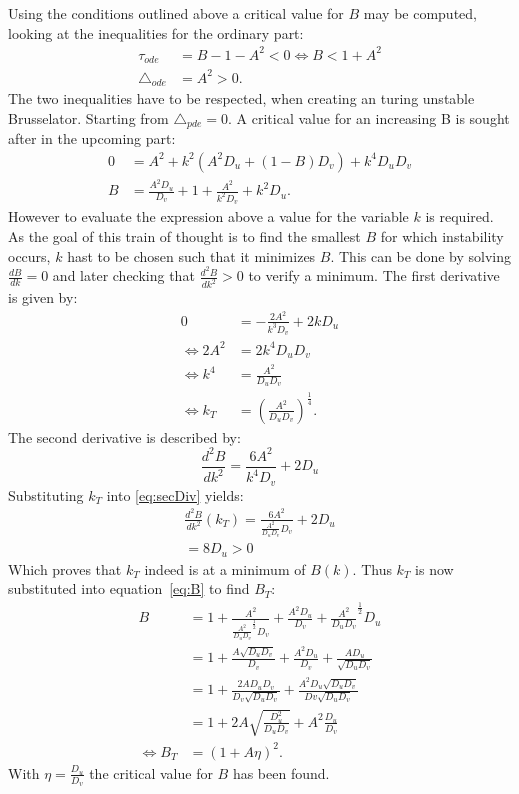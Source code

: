 Using the conditions outlined above a critical value for $B$ may be computed, looking at the inequalities for the ordinary part:
\begin{align}
\tau_{ode} &= B - 1 - A^2 < 0 \Leftrightarrow B < 1 + A^2 \\
\triangle_{ode} &= A^2 > 0.
\end{align}
The two inequalities have to be respected, when creating an turing unstable Brusselator. Starting from $\triangle_{pde} = 0$. A critical value for an increasing B is sought after in the upcoming part:
\begin{align}
0 &= A^2 + k^2 (A^2 D_u + (1 - B)D_v) + k^4D_u D_v \\
B &= \frac{A^2 D_u}{D_v} + 1 + \frac{A^2}{k^2 D_v} + k^2 D_u. 
\label{eq:B}
\end{align}
However to evaluate the expression above a value for the variable $k$ is required. As the goal of this train of thought is to find the smallest $B$ for which instability occurs, $k$ hast to be chosen such that it minimizes $B$. This can be done by solving $\frac{dB}{dk} = 0$ and later checking that $\frac{d^2 B}{dk^2} > 0$ to verify a minimum. The first derivative is given by:
\begin{align}
0 &= -\frac{2 A^2}{k^3 D_v} + 2kD_u \\
\Leftrightarrow 2A^2 &= 2k^4 D_u D_v \\
\Leftrightarrow k^4 &= \frac{A^2}{D_u D_v} \\
\Leftrightarrow k_T &= (\frac{A^2}{D_u D_v})^\frac{1}{4}.
\end{align}
The second derivative is described by:
\begin{equation}
\frac{d^2B}{dk^2} =\frac{6 A^2}{k^4 D_v} + 2 D_u
\label{eq:secDiv}
\end{equation}
Substituting $k_T$ into \ref{eq:secDiv} yields:
\begin{align}
\frac{d^2B}{dk^2}(k_T) = \frac{6A^2}{\frac{A^2}{D_u D_v} D_v} + 2D_u \\
= 8 D_u > 0 
\end{align}
Which proves that $k_T$ indeed is at a minimum of $B(k)$. Thus $k_T$ is now substituted into equation~\ref{eq:B} to find $B_T$:
\begin{align}
B &= 1 + \frac{A^2}{\frac{A^2}{D_u D_v}^\frac{1}{2} D_v} + \frac{A^2D_u}{D_v} + \frac{A^2}{D_u D_v}^\frac{1}{2} D_u \\
 &= 1 + \frac{A \sqrt{D_u D_v}}{D_v} + \frac{A^2 D_u}{D_v} + \frac{A D_u}{\sqrt{D_u D_v}} \\
 &= 1 + \frac{2AD_u D_v}{D_v \sqrt{D_u D_v}} + \frac{A^2 D_u \sqrt{D_u D_v}}{Dv \sqrt{D_u D_v}} \\
 &= 1 + 2A \sqrt{\frac{D_u^2}{D_u D_v}} + A^2\frac{D_u}{D_v} \\
\Leftrightarrow B_T &= (1 + A\eta)^2.
\end{align}
With $\eta = \frac{D_u}{D_v}$ the critical value for $B$ has been found. 


